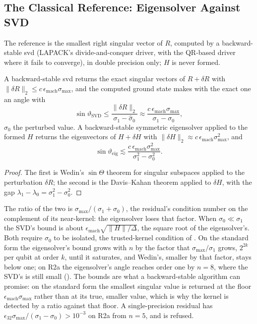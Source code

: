 \subsection{The Classical Reference: Eigensolver Against SVD}
\label{app:eigh-vs-svd}

The reference is the smallest right singular vector of $R$, computed by a backward-stable \gls{svd} (LAPACK's divide-and-conquer driver, with the QR-based driver where it fails to converge), in double precision only; $H$ is never formed.

\begin{proposition}
\label{prop:wedin}
A backward-stable \gls{svd} returns the exact singular vectors of $R+\delta R$ with $\|\delta R\|_2\le c\,\epsilon_{\mathrm{mach}}\sigma_{\max}$, and the computed ground state makes with the exact one an angle with
\begin{equation}
    \sin\vartheta_{\mathrm{SVD}}\le\frac{\|\delta R\|_2}{\sigma_1-\hat\sigma_0}\approx\frac{c\,\epsilon_{\mathrm{mach}}\sigma_{\max}}{\sigma_1-\sigma_0},
    \label{eq:wedin}
\end{equation}
$\hat\sigma_0$ the perturbed value. A backward-stable symmetric eigensolver applied to the formed $H$ returns the eigenvectors of $H+\delta H$ with $\|\delta H\|_2\approx c\,\epsilon_{\mathrm{mach}}\sigma_{\max}^2$, and
\begin{equation*}
    \sin\vartheta_{\mathrm{eig}}\lesssim\frac{c\,\epsilon_{\mathrm{mach}}\sigma_{\max}^2}{\sigma_1^2-\sigma_0^2}.
\end{equation*}
\end{proposition}
\begin{proof}
The first is Wedin's $\sin\Theta$ theorem for singular subspaces \cite{wedin1972perturbation} applied to the perturbation $\delta R$; the second is the Davis--Kahan theorem \cite{daviskahan1970rotation} applied to $\delta H$, with the gap $\lambda_1-\lambda_0=\sigma_1^2-\sigma_0^2$.
\end{proof}

The ratio of the two is $\sigma_{\max}/(\sigma_1+\sigma_0)$, the residual's condition number on the complement of its near-kernel: the eigensolver loses that factor. When $\sigma_0\ll\sigma_1$ the SVD's bound is about $\epsilon_{\mathrm{mach}}\sqrt{\|H\|/\Delta}$, the square root of the eigensolver's. Both require $\sigma_0$ to be isolated, the trusted-kernel condition of . On the standard form the eigensolver's bound grows with $n$ by the factor that $\sigma_{\max}/\sigma_1$ grows, $2^{2k}$ per qubit at order $k$, until it saturates, and Wedin's, smaller by that factor, stays below one; on R2a the eigensolver's angle reaches order one by $n=8$, where the SVD's is still small (). The bounds are what a backward-stable algorithm can promise: on the standard form the smallest singular value is returned at the floor $\epsilon_{\mathrm{mach}}\sigma_{\max}$ rather than at its true, smaller value, which is why the kernel is detected by a ratio against that floor. A single-precision residual has $\epsilon_{32}\sigma_{\max}/(\sigma_1-\sigma_0)>10^{-3}$ on R2a from $n=5$, and is refused.

